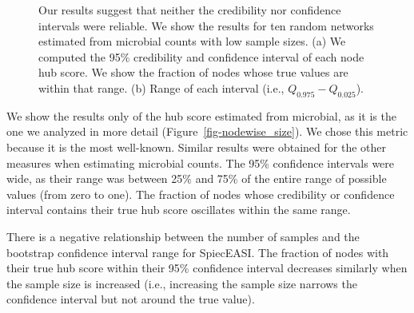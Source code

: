 \documentclass[
  a4paper,
]{article}
\begin{document}
\begin{figure}

\begin{minipage}[t]{\linewidth}

{\centering 


}

\end{minipage}%
\newline
\begin{minipage}[t]{\linewidth}

{\centering 


}

\end{minipage}%

\caption{\label{fig-intervals}Our results suggest that neither the
credibility nor confidence intervals were reliable. We show the results
for ten random networks estimated from microbial counts with low sample
sizes. (a) We computed the 95\% credibility and confidence interval of
each node hub score. We show the fraction of nodes whose true values are
within that range. (b) Range of each interval (i.e.,
\(Q_{0.975} - Q_{0.025}\)).}

\end{figure}

We show the results only of the hub score estimated from microbial, as
it is the one we analyzed in more detail
(Figure~\ref{fig-nodewise_size}). We chose this metric because it is the
most well-known. Similar results were obtained for the other measures
when estimating microbial counts. The 95\% confidence intervals were
wide, as their range was between 25\% and 75\% of the entire range of
possible values (from zero to one). The fraction of nodes whose
credibility or confidence interval contains their true hub score
oscillates within the same range.

There is a negative relationship between the number of samples and the
bootstrap confidence interval range for SpiecEASI. The fraction of nodes
with their true hub score within their 95\% confidence interval
decreases similarly when the sample size is increased (i.e., increasing
the sample size narrows the confidence interval but not around the true
value).
\end{document}
